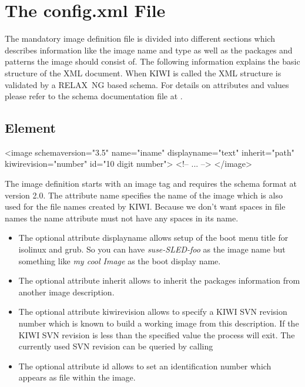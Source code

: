 \section{The config.xml File}
The mandatory image definition file is divided into different sections
which describes information like the image name and type as well as
the packages and patterns the image should consist of. The following
information explains the basic structure of the XML document. When KIWI
is called the XML structure is validated by a RELAX~NG based schema.
For details on attributes and values please refer to the schema
documentation file at .

\subsection{ Element}
\begin{xml}
<image schemaversion="3.5" name="iname"
 displayname="text"
 inherit="path" kiwirevision="number"
 id="10 digit number">
  <!-- ... -->
</image>
\end{xml}

The image definition starts with an image tag and requires the
schema format at version 2.0. The attribute name specifies the
name of the image which is also used for the file names created
by KIWI. Because we don't want spaces in file names the name
attribute must not have any spaces in its name.

\begin{itemize}
\item The optional attribute displayname allows setup of the boot
      menu title for isolinux and grub. So you can have
      \textit{suse-SLED-foo} as the image name but something like
      \textit{my cool Image} as the boot display name.
\item The optional attribute inherit allows to inherit the
      packages information from another image description.
\item The optional attribute kiwirevision allows to specify
      a KIWI SVN revision number which is known to build
      a working image from this description. If the KIWI SVN
      revision is less than the specified value the
      process will exit. The currently used SVN revision can
      be queried by calling 
\item The optional attribute id allows to set an identification
      number which appears as file  within the
      image.
\end{itemize}


